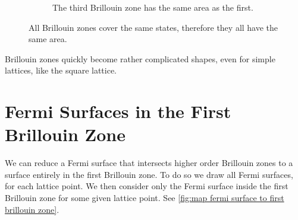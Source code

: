 \documentclass[fleqn]{NotesClass}
\begin{document}
\begin{figure}
\begin{subfigure}{0.4\textwidth}
            \caption{The third Brillouin zone has the same area as the first.}
        \end{subfigure}
        \caption[Brillouin zones have the same area]{All Brillouin zones cover the same states, therefore they all have the same area.}
        \label{fig:brillouin zone area}
    \end{figure}
    
    Brillouin zones quickly become rather complicated shapes, even for simple lattices, like the square lattice.
    
    \section{Fermi Surfaces in the First Brillouin Zone}
    We can reduce a Fermi surface that intersects higher order Brillouin zones to a surface entirely in the first Brillouin zone.
    To do so we draw all Fermi surfaces, for each lattice point.
    We then consider only the Fermi surface inside the first Brillouin zone for some given lattice point.
    See \cref{fig:map fermi surface to first brillouin zone}.
    
\end{document}
